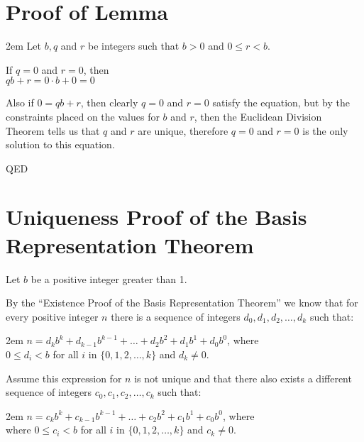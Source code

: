 \documentclass{article}
\newenvironment{jprIn}{\begin{adjustwidth}{2em}{}}{\end{adjustwidth}}
\begin{document}
\section*{Proof of Lemma}
\begin{jprIn}
Let $b, q$ and $r$ be integers such that $b>0$ and $0\le{}r<b$.

If $q=0$ and $r=0$, then \\
\hphantom{2em}$qb+r=0\cdot{}b+0=0$

Also if $0=qb+r$, then
clearly
$q=0$ and $r=0$ satisfy the equation,
but by the constraints
placed on the values for $b$ and $r$, then the Euclidean Division Theorem tells us
that $q$ and $r$ are unique, therefore 
$q=0$ and $r=0$ is the only solution to this equation.

\hspace*{\fill}QED
\end{jprIn}

\break
\section*{Uniqueness Proof of the Basis Representation Theorem}

Let $b$ be a positive integer greater than 1.

By the ``Existence Proof of the Basis Representation Theorem'' we know
that for every positive integer $n$ there is a sequence
of integers $d_0, d_1, d_2,\dots{},d_k$ such that:
\begin{jprIn}
$n=d_kb^k+d_{k-1}b^{k-1}+\dots+d_2b^2+d_1b^1+d_0b^0$, where\\
\hphantom{2em}$0\le{}d_i<b$ for all $i$ in $\{0,1,2,\dots{},k\}$ and $d_k\ne0$.
\end{jprIn}

Assume this expression for $n$ is not unique and that there also exists
a different sequence
of integers $c_0, c_1, c_2,\dots{},c_k$ such that:
\begin{jprIn}
$n=c_kb^k+c_{k-1}b^{k-1}+\dots+c_2b^2+c_1b^1+c_0b^0$, where\\
\hphantom{2em}where $0\le{}c_i<b$ for all $i$ in $\{0,1,2,\dots{},k\}$ and $c_k\ne0$.
\end{jprIn}
\end{document}
